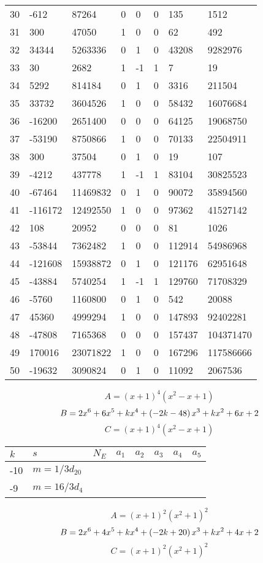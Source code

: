 \documentclass{amsart}
\begin{document}
\begin{longtable}{|l|l|l|lllll|}
30&-612&87264&0&0&0&135&1512\\
31&300&47050&1&0&0&62&492\\
32&34344&5263336&0&1&0&43208&9282976\\
33&30&2682&1&-1&1&7&19\\
34&5292&814184&0&1&0&3316&211504\\
35&33732&3604526&1&0&0&58432&16076684\\
36&-16200&2651400&0&0&0&64125&19068750\\
37&-53190&8750866&1&0&0&70133&22504911\\
38&300&37504&0&1&0&19&107\\
39&-4212&437778&1&-1&1&83104&30825523\\
40&-67464&11469832&0&1&0&90072&35894560\\
41&-116172&12492550&1&0&0&97362&41527142\\
42&108&20952&0&0&0&81&1026\\
43&-53844&7362482&1&0&0&112914&54986968\\
44&-121608&15938872&0&1&0&121176&62951648\\
45&-43884&5740254&1&-1&1&129760&71708329\\
46&-5760&1160800&0&1&0&542&20088\\
47&45360&4999294&1&0&0&147893&92402281\\
48&-47808&7165368&0&0&0&157437&104371470\\
49&170016&23071822&1&0&0&167296&117586666\\
50&-19632&3090824&0&1&0&11092&2067536\\
\hline
\end{longtable}
$$A=(x
 + 1)^{4}(x^2
 - x
 + 1)$$
$$B=2\*x^6
 + 6\*x^5
 + k\*x^4
 + \left(-2\*k
 - 48\right) \*x^3
 + k\*x^2
 + 6\*x
 + 2$$
$$C=(x
 + 1)^{4}(x^2
 - x
 + 1)$$
\begin{longtable}{|l|l|l|lllll|}
\hline
$k$ & $s$ & $N_E$ & $a_1$ & $a_2$ & $a_3$ & $a_4$ & $a_5$\\
\hline
-10&$m=1/3d_{20}$&&\multicolumn{5}{c|}{}\\
-9&$m=16/3d_{4}$&&\multicolumn{5}{c|}{}\\
\hline
\end{longtable}
$$A=(x
 + 1)^{2}(x^2
 + 1)^{2}$$
$$B=2\*x^6
 + 4\*x^5
 + k\*x^4
 + \left(-2\*k
 + 20\right) \*x^3
 + k\*x^2
 + 4\*x
 + 2$$
$$C=(x
 + 1)^{2}(x^2
 + 1)^{2}$$
\end{document}
